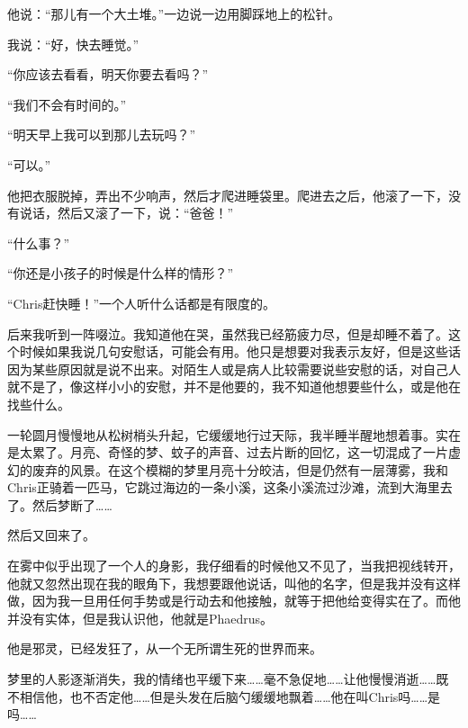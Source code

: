 \documentclass[UTF8]{article}
\begin{document}
\par 他说：“那儿有一个大土堆。”一边说一边用脚踩地上的松针。
\par 我说：“好，快去睡觉。”
\par “你应该去看看，明天你要去看吗？”
\par “我们不会有时间的。”
\par “明天早上我可以到那儿去玩吗？”
\par “可以。”
\par 他把衣服脱掉，弄出不少响声，然后才爬进睡袋里。爬进去之后，他滚了一下，没有说话，然后又滚了一下，说：“爸爸！”
\par “什么事？”
\par “你还是小孩子的时候是什么样的情形？”
\par “Chris赶快睡！”一个人听什么话都是有限度的。
\par 后来我听到一阵啜泣。我知道他在哭，虽然我已经筋疲力尽，但是却睡不着了。这个时候如果我说几句安慰话，可能会有用。他只是想要对我表示友好，但是这些话因为某些原因就是说不出来。对陌生人或是病人比较需要说些安慰的话，对自己人就不是了，像这样小小的安慰，并不是他要的，我不知道他想要些什么，或是他在找些什么。
\par 一轮圆月慢慢地从松树梢头升起，它缓缓地行过天际，我半睡半醒地想着事。实在是太累了。月亮、奇怪的梦、蚊子的声音、过去片断的回忆，这一切混成了一片虚幻的废弃的风景。在这个模糊的梦里月亮十分皎洁，但是仍然有一层薄雾，我和Chris正骑着一匹马，它跳过海边的一条小溪，这条小溪流过沙滩，流到大海里去了。然后梦断了……
\par 然后又回来了。
\par 在雾中似乎出现了一个人的身影，我仔细看的时候他又不见了，当我把视线转开，他就又忽然出现在我的眼角下，我想要跟他说话，叫他的名字，但是我并没有这样做，因为我一旦用任何手势或是行动去和他接触，就等于把他给变得实在了。而他并没有实体，但是我认识他，他就是Phaedrus。
\par 他是邪灵，已经发狂了，从一个无所谓生死的世界而来。
\par 梦里的人影逐渐消失，我的情绪也平缓下来……毫不急促地……让他慢慢消逝……既不相信他，也不否定他……但是头发在后脑勺缓缓地飘着……他在叫Chris吗……是吗……
\end{document}
